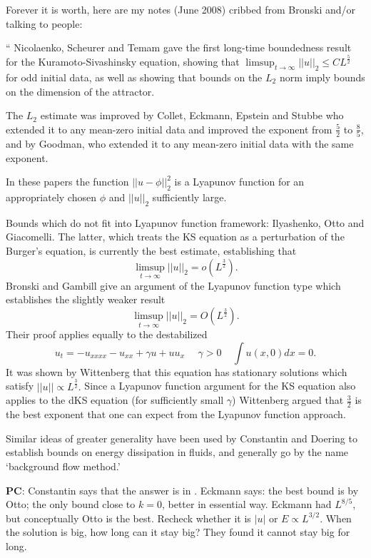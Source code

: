 \begin{description}
  Forever it is worth, here are my notes (June 2008) cribbed from
  Bronski and/or talking to people:

  ``
  Nicolaenko, Scheurer and Temam gave the first long-time
  boundedness result for the Kuramoto-Sivashinsky equation, showing that
  $\limsup_{t \rightarrow \infty} |\!|u|\!|_2 \le C L^{\frac{5}{2}}$ for
  odd initial data, as well as showing that bounds on the $L_2$ norm imply
  bounds on the dimension of the attractor.

  The $L_2$ estimate was improved by Collet, Eckmann, Epstein and
  Stubbe who  extended it to any mean-zero initial data and
  improved the exponent from $\frac{5}{2}$ to $\frac{8}{5}$, and by
  Goodman, who extended it to any mean-zero initial data with the
  same exponent.

  In these papers the function $|\!|u-\phi|\!|_2^2$ is a Lyapunov function
  for an appropriately chosen $\phi$ and $|\!|u|\!|_2$ sufficiently large.

  Bounds which do not fit into Lyapunov function framework:
  Ilyashenko, Otto  and Giacomelli. The
  latter, which treats the KS equation as a perturbation of the Burger's
  equation, is currently the best estimate, establishing that
  \[
    \limsup_{t \rightarrow \infty} |\!|u|\!|_2 = o(L^{\frac{3}{2}}).
  \]
  Bronski and Gambill give an argument of the Lyapunov
  function type which establishes the slightly weaker result
  \[
    \limsup_{t \rightarrow \infty} |\!|u|\!|_2 = O(L^{\frac{3}{2}}).
  \]
  Their proof applies equally to the destabilized \KSe
  \[
    u_t = -u_{xxxx} - u_{xx} + \gamma  u + u u_x
    ~~~~~~\gamma > 0 ~~~~~ \int u(x,0)dx = 0.
  \]
  It was shown by Wittenberg that this equation
  has stationary solutions which satisfy $|\!|u|\!| \propto L^{\frac{3}{2}}.$
  Since a Lyapunov function argument for the KS equation also applies
  to the dKS equation (for sufficiently small $\gamma$) Wittenberg
  argued that $\frac{3}{2}$ is the best exponent that one can expect
  from the Lyapunov function approach.

  Similar ideas of greater generality have been used by Constantin and
  Doering to establish bounds on energy dissipation in
  fluids, and generally go by the name `background flow method.'

  {\bf PC}:
  Constantin says that the answer is in . Eckmann says:
  the  best bound is by Otto; the only bound close to $k=0$,
  better in essential way. Eckmann had
  $L^{8/5}$, but conceptually Otto is the best. Recheck whether it is $|u|$
  or $E \propto L^{3/2}$. When the solution is big, how long can it stay
  big? They found it cannot stay big for long.


\end{description}
